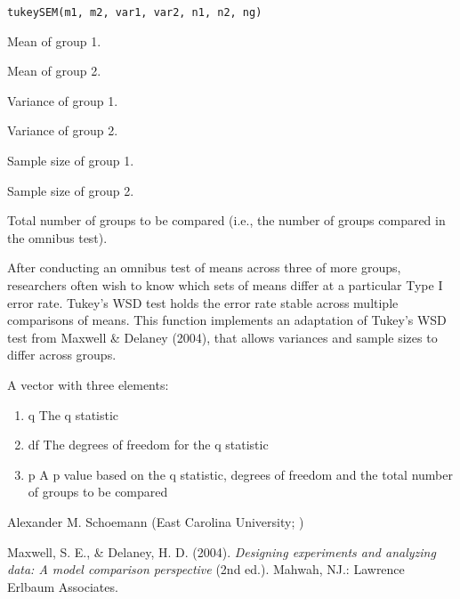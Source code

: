 \documentclass[a4paper]{book}
\begin{document}
%
\begin{Usage}
\begin{verbatim}
tukeySEM(m1, m2, var1, var2, n1, n2, ng)
\end{verbatim}
\end{Usage}
%
\begin{Arguments}
\begin{ldescription}
\item[\code{m1}] Mean of group 1.
\item[\code{m2}] Mean of group 2.
\item[\code{var1}] Variance of group 1.
\item[\code{var2}] Variance of group 2.
\item[\code{n1}] Sample size of group 1.
\item[\code{n2}] Sample size of group 2.
\item[\code{ng}] Total number of groups to be compared (i.e., the number of groups compared in the omnibus test).
\end{ldescription}
\end{Arguments}
%
\begin{Details}\relax
After conducting an omnibus test of means across three of more groups, researchers often wish to know which sets of means differ at a particular Type I error rate. Tukey's WSD test holds the error rate stable across multiple comparisons of means. This function implements an adaptation of Tukey's WSD test from Maxwell \& Delaney (2004), that allows variances and sample sizes to differ across groups. 
\end{Details}
%
\begin{Value}
A vector with three elements:
\begin{enumerate}

\item q The q statistic
\item df The degrees of freedom for the q statistic
\item p A p value based on the q statistic, degrees of freedom and the total number of groups to be compared

\end{enumerate}

\end{Value}
%
\begin{Author}\relax
Alexander M. Schoemann (East Carolina University; )
\end{Author}
%
\begin{References}\relax
Maxwell, S. E., \& Delaney, H. D. (2004). \emph{Designing experiments and analyzing data: A model comparison perspective} (2nd ed.). Mahwah, NJ.: Lawrence Erlbaum Associates.

\end{References}
\end{document}
